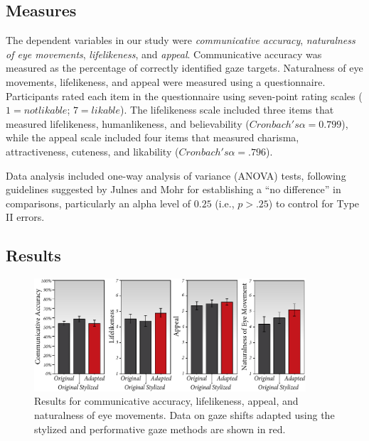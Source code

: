 \subsection{Measures}

The dependent variables in our study were \textit{communicative accuracy}, \textit{naturalness of eye movements}, \textit{lifelikeness}, and \textit{appeal}. Communicative accuracy was measured as the percentage of correctly identified gaze targets. Naturalness of eye movements, lifelikeness, and appeal were measured using a questionnaire. Participants rated each item in the questionnaire using seven-point rating scales ($1 = not likable$; $7 = likable$). The lifelikeness scale included three items that measured lifelikeness, humanlikeness, and believability ($Cronbach's \alpha = 0.799$), while the appeal scale included four items that measured charisma, attractiveness, cuteness, and likability ($Cronbach's \alpha = .796$).

Data analysis included one-way analysis of variance (ANOVA) tests, following guidelines suggested by Julnes and Mohr \cite{julnes1989analysis} for establishing a ``no difference'' in comparisons, particularly an alpha level of $0.25$ (i.e., $p > .25$) to control for Type II errors.

\subsection{Results}

\begin{figure}
\centering
\includegraphics[width=0.9\textwidth]{stylizedgaze/Figures/Results.pdf}
\caption{Results for communicative accuracy, lifelikeness, appeal, and naturalness of eye movements. Data on gaze shifts adapted using the stylized and performative gaze methods are shown in red.}
\label{fig:StudyResults}
\end{figure}

